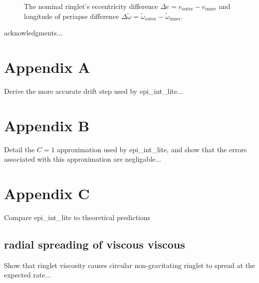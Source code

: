 \documentclass[preprint]{aastex62}
\begin{document}
\begin{figure}
\caption{
\label{fig:de_prime_nominal}
The nominal ringlet's eccentricity difference $\Delta e = e_{\text{outer}} - e_{\text{inner}}$
and longitude of periapse difference
$\Delta\tilde{\omega} = \tilde{\omega}_{\text{outer}} - \tilde{\omega}_{\text{inner}}$.}
\end{figure}

\acknowledgments

acknowledgments...

\appendix

\section{Appendix A}
\label{sec:Appendix A}

Derive the more accurate drift step used by epi\_int\_lite...

\section{Appendix B}
\label{sec:Appendix B}

Detail the $C=1$ approximation used by epi\_int\_lite, and show that the errors
associated with this approximation are negligable...

\section{Appendix C}
\label{sec:Appendix C}

Compare epi\_int\_lite to theoretical predictions

\subsection{radial spreading of viscous viscous}
\label{subsec:spreading}

Show that ringlet viscosity causes circular non-gravitating ringlet to
spread at the expected rate...

%

\end{document}
